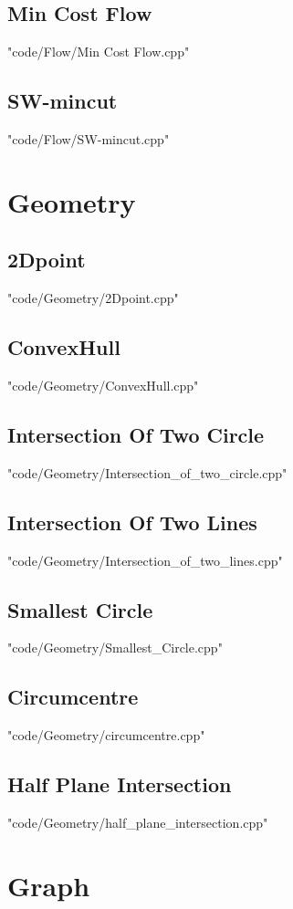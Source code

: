 \subsection{Min Cost Flow}
 {"code/Flow/Min Cost Flow.cpp"}
\subsection{SW-mincut}
 {"code/Flow/SW-mincut.cpp"}
\section{Geometry}
\subsection{2Dpoint}
 {"code/Geometry/2Dpoint.cpp"}
\subsection{ConvexHull}
 {"code/Geometry/ConvexHull.cpp"}
\subsection{Intersection Of Two Circle}
 {"code/Geometry/Intersection_of_two_circle.cpp"}
\subsection{Intersection Of Two Lines}
 {"code/Geometry/Intersection_of_two_lines.cpp"}
\subsection{Smallest Circle}
 {"code/Geometry/Smallest_Circle.cpp"}
\subsection{Circumcentre}
 {"code/Geometry/circumcentre.cpp"}
\subsection{Half Plane Intersection}
 {"code/Geometry/half_plane_intersection.cpp"}
\section{Graph}
